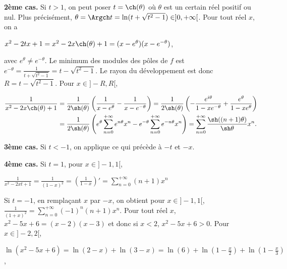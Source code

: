 {{\begin{center}
\shadowbox{
$\forall t\in]-1,1[$, $\forall x\in]-1,1[$, $\frac{1}{x^2-2xt+1}=\sum_{n=0}^{+\infty}\frac{\sin((n+1)\theta)}{\sin\theta}x^n$ où $\theta=\Arccos t$.
}
\end{center}

\textbf{2ème cas.} Si $t > 1$, on peut poser $t =\ch(\theta)$ où $\theta$ est un certain réel positif ou nul. Plus précisément, $\theta=\Argch t=\ln(t+\sqrt{t^2-1})\in]0,+\infty[$. Pour tout réel $x$, on a

\begin{center}
$x^2 -2tx +1 =x^2 -2x\ch(\theta)+1=(x-e^{\theta})(x-e^{-\theta})$,
\end{center}

avec $e^\theta\neq e^{-\theta}$. Le minimum des modules des pôles de $f$ est $e^{-\theta}=\frac{1}{t+\sqrt{t^2-1}}= t-\sqrt{t^2-1}$. Le rayon du développement est donc $R=t-\sqrt{t^2-1}$. Pour $x\in]-R,R[$,

\begin{align*}\ensuremath
\frac{1}{x^2-2x\ch(\theta)+1}&=\frac{1}{2\sh(\theta)}\left(\frac{1}{x-e^{\theta}}-\frac{1}{x-e^{-\theta}}\right) =\frac{1}{2\sh(\theta)}\left(-\frac{e^{i\theta}}{1-xe^{-\theta}}+\frac{e^{\theta}}{1-xe^{\theta}}\right)\\
  &=\frac{1}{2\sh(\theta)}\left(e^{\theta}\sum_{n=0}^{+\infty}e^{n\theta}x^n-e^{-\theta}\sum_{n=0}^{+\infty}e^{-n\theta}x^n\right) =\sum_{n=0}^{+\infty}\frac{\sh((n+1)\theta)}{\sh\theta}x^n.
\end{align*}

\textbf{3ème cas.} Si $t < -1$, on applique ce qui précède à $-t$ et $-x$.

\textbf{4ème cas.} Si $t = 1$, pour $x\in]-1,1[$,

\begin{center}
$\frac{1}{x^2-2xt+1}=\frac{1}{(1-x)^2}=\left(\frac{1}{1-x}\right)'=\sum_{n=0}^{+\infty}(n+1)x^n$
\end{center}

Si $t = -1$, en remplaçant $x$ par $-x$,  on obtient pour $x\in]-1,1[$, $\frac{1}{(1+x)^2}=\sum_{n=0}^{+\infty}(-1)^n(n+1)x^n$.
Pour tout réel $x$, $x^2 -5x+6=(x-2)(x-3)$ et donc si $x < 2$, $x^2-5x+6>0$. Pour $x\in ]-2,2[$,

\begin{center}
$\ln(x^2-5x+6)=\ln(2-x)+\ln(3-x)=\ln(6)+\ln\left(1-\frac{x}{2}\right)+\ln\left(1-\frac{x}{3}\right)$,
\end{center}

}}
